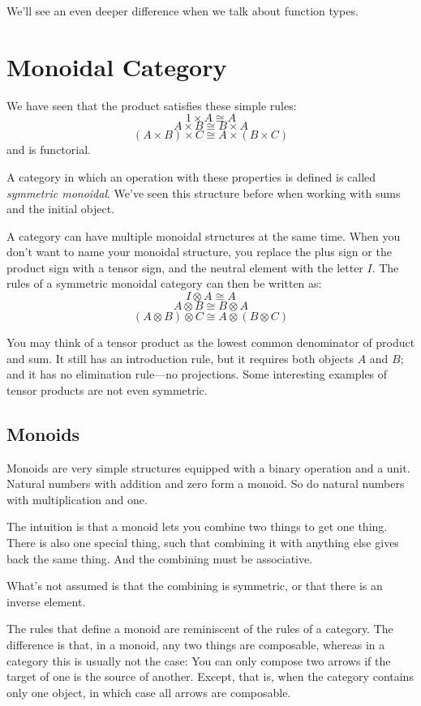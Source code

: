 \documentclass[DaoFP]{subfiles}
\begin{document}
We'll see an even deeper difference when we talk about function types.

\section{Monoidal Category}

We have seen that the product satisfies these simple rules:
\[1 \times A \cong A\]
\[A \times B \cong B \times A \]
\[(A \times B) \times C \cong A \times (B \times C) \]
and is functorial. 

A category in which an operation with these properties is defined is called \emph{symmetric monoidal}. We've seen this structure before when working with sums and the initial object. 

A category can have multiple monoidal structures at the same time. When you don't want to name your monoidal structure, you replace the plus sign or the product sign with a tensor sign, and the neutral element with the letter $I$. The rules of a symmetric monoidal category can then be written as:
\[I \otimes A \cong A\]
\[A \otimes B \cong B \otimes A \]
\[(A \otimes B) \otimes C \cong A \otimes (B \otimes C) \]

You may think of a tensor product as the lowest common denominator of product and sum. It still has an introduction rule, but it requires both objects $A$ and $B$; and it has no elimination rule---no projections. Some interesting examples of tensor products are not even symmetric. 

\subsection{Monoids}

Monoids are very simple structures equipped with a binary operation and a unit. Natural numbers with addition and zero form a monoid. So do natural numbers with multiplication and one. 

The intuition is that a monoid lets you combine two things to get one thing. There is also one special thing, such that combining it with anything else gives back the same thing. And the combining must be associative. 

What's not assumed is that the combining is symmetric, or that there is an inverse element.

The rules that define a monoid are reminiscent of the rules of a category. The difference is that, in a monoid, any two things are composable, whereas in a category this is usually not the case: You can only compose two arrows if the target of one is the source of another. Except, that is, when the category contains only one object, in which case all arrows are composable.
\end{document}
